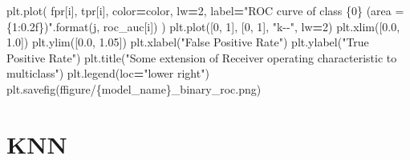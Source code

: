 \documentclass[12pt,twoside]{deuthesis}
\newenvironment{Shaded}{\begin{snugshade}}{\end{snugshade}}
\newcommand{\BuiltInTok}[1]{#1}
\newcommand{\DecValTok}[1]{\textcolor[rgb]{0.00,0.00,0.81}{#1}}
\newcommand{\FloatTok}[1]{\textcolor[rgb]{0.00,0.00,0.81}{#1}}
\newcommand{\NormalTok}[1]{#1}
\newcommand{\OperatorTok}[1]{\textcolor[rgb]{0.81,0.36,0.00}{\textbf{#1}}}
\newcommand{\SpecialCharTok}[1]{\textcolor[rgb]{0.00,0.00,0.00}{#1}}
\newcommand{\SpecialStringTok}[1]{\textcolor[rgb]{0.31,0.60,0.02}{#1}}
\newcommand{\StringTok}[1]{\textcolor[rgb]{0.31,0.60,0.02}{#1}}
\begin{document}
\begin{Shaded}
\begin{Highlighting}[]
\NormalTok{        plt.plot(}
\NormalTok{        fpr[i],}
\NormalTok{        tpr[i],}
\NormalTok{        color}\OperatorTok{=}\NormalTok{color,}
\NormalTok{        lw}\OperatorTok{=}\DecValTok{2}\NormalTok{,}
\NormalTok{        label}\OperatorTok{=}\StringTok{"ROC curve of class }\SpecialCharTok{\{0\}}\StringTok{ (area = }\SpecialCharTok{\{1:0.2f\}}\StringTok{)"}\NormalTok{.}\BuiltInTok{format}\NormalTok{(j, roc\_auc[i])}
\NormalTok{        )}
\NormalTok{    plt.plot([}\DecValTok{0}\NormalTok{, }\DecValTok{1}\NormalTok{], [}\DecValTok{0}\NormalTok{, }\DecValTok{1}\NormalTok{], }\StringTok{"k{-}{-}"}\NormalTok{, lw}\OperatorTok{=}\DecValTok{2}\NormalTok{)}
\NormalTok{    plt.xlim([}\FloatTok{0.0}\NormalTok{, }\FloatTok{1.0}\NormalTok{])}
\NormalTok{    plt.ylim([}\FloatTok{0.0}\NormalTok{, }\FloatTok{1.05}\NormalTok{])}
\NormalTok{    plt.xlabel(}\StringTok{"False Positive Rate"}\NormalTok{)}
\NormalTok{    plt.ylabel(}\StringTok{"True Positive Rate"}\NormalTok{)}
\NormalTok{    plt.title(}\StringTok{"Some extension of Receiver operating characteristic to multiclass"}\NormalTok{)}
\NormalTok{    plt.legend(loc}\OperatorTok{=}\StringTok{"lower right"}\NormalTok{)}
\NormalTok{    plt.savefig(}\SpecialStringTok{f\textquotesingle{}figure/}\SpecialCharTok{\{}\NormalTok{model\_name}\SpecialCharTok{\}}\SpecialStringTok{\_binary\_roc.png\textquotesingle{}}\NormalTok{)}
\end{Highlighting}
\end{Shaded}
\hypertarget{knn-2}{%
\section{KNN}\label{knn-2}}
\end{document}
